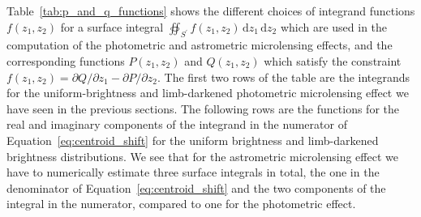 \documentclass[12pt,dvipsnames]{report}
\newcommand{\ud}{\,\mathrm{d}}
\begin{document}
Table~\ref{tab:p_and_q_functions} shows the different choices of integrand functions 
$f(z_1,z_2)$ for a surface integral  $\oiint_{{S}^\prime}f(z_1,z_2)\ud z_1\ud z_2$ which 
are used in the computation of the photometric and astrometric microlensing effects, and 
the corresponding functions $P(z_1,z_2)$ and $Q(z_1,z_2)$ which satisfy the constraint
$f(z_1, z_2) = \partial Q/\partial z_1 - \partial P/\partial z_2$.
The first two rows of the table are the integrands for the uniform-brightness 
and limb-darkened photometric microlensing effect we have seen in the previous sections.
The following rows are the functions for the real and imaginary components of the integrand 
in the numerator of Equation~\ref{eq:centroid_shift} for the uniform brightness and 
limb-darkened brightness  distributions.
We see that for the astrometric microlensing effect we have to numerically estimate three 
surface integrals in total, the one in the denominator of Equation~\ref{eq:centroid_shift} 
and the two components of the integral in the numerator, compared to one for the photometric 
effect. 
\end{document}
